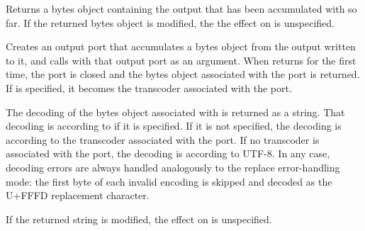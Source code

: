 \begin{entry}{%
}

Returns a bytes object containing the output that has been accumulated with
 so far.
If the returned bytes object is modified, the
the effect on  is unspecified.
\end{entry}

\begin{entry}{%
}

Creates an output port that accumulates a bytes object from the output
written to it, and calls  with that output port as an
argument. When  returns for the first time, the port is
closed and the bytes object associated with the port is returned.  If
 is specified, it becomes the transcoder associated
with the port.
\end{entry}

\begin{entry}{%
}

The decoding of the bytes object associated with  is returned
as a string.  That decoding is according to
 if it is specified.  If it is not specified,
the decoding is according to the transcoder associated with the port.
If no transcoder is associated with the port, the decoding is
according to UTF-8.
In any
case, decoding errors are always handled analogously to the {\cf
  replace} error-handling mode: the first byte of each invalid
encoding is skipped and decoded as the U+FFFD replacement character.

If the returned string is modified, 
the effect on  is unspecified.
\end{entry}

